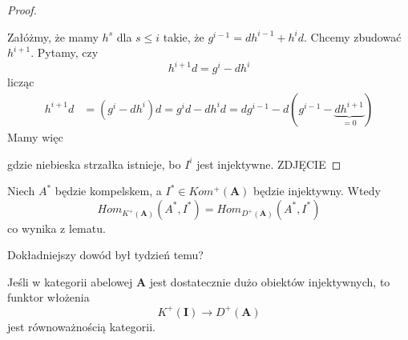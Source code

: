 \begin{proof}
  \begin{center}\end{center}
  Załóżmy, że mamy $h^s$ dla $s\leq i$ takie, że $g^{i-1}=dh^{i-1}+h^id$. Chcemy zbudować $h^{i+1}$.
  Pytamy, czy
  $$h^{i+1}d=g^i-dh^i$$
  licząc
  \begin{align*}
    h^{i+1}d&=(g^i-dh^i)d=g^id-dh^id=dg^{i-1}-d(g^{i-1}-\underbrace{dh^{i+1}}_{=0})
  \end{align*}
  Mamy więc
  \begin{center}\end{center}
  gdzie niebieska strzałka istnieje, bo $I^i$ jest injektywne. {\large\color{red}ZDJĘCIE}
\end{proof}

\begin{conclusion}\label{wniosek 12.2}
  Niech $A^*$ będzie kompelskem, a $I^*\in Kom^+(\mathbf{A})$ będzie injektywny. Wtedy 
  $$Hom_{K^+(\mathbf{A})}(A^*, I^*)=Hom_{D^+(\mathbf{A})}(A^*, I^*)$$
  co wynika z lematu.
\end{conclusion}

{\large\color{red}Dokładniejszy dowód był tydzień temu?}

\begin{theorem}
  Jeśli w kategorii abelowej $\mathbf{A}$ jest dostatecznie dużo obiektów injektywnych, to funktor włożenia
  $$K^+(\mathbf{I})\to D^+(\mathbf{A})$$
  jest równoważnością kategorii.
\end{theorem}

